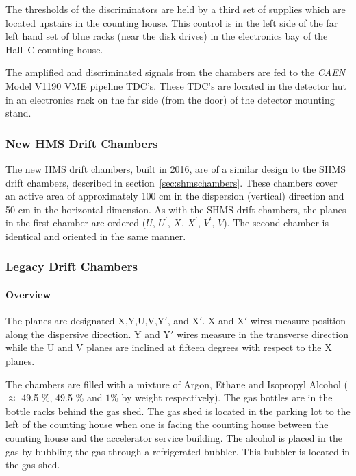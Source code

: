 The thresholds of the discriminators are held by a third set of supplies
which are located upstairs in the counting house. This control
is in the left side of the far left hand set of blue racks (near the disk drives) in the
electronics bay of the Hall~C counting house.

The amplified and discriminated signals from the chambers are fed
to the {\em CAEN} Model V1190 VME pipeline TDC's. These
TDC's are located in the detector hut in an electronics rack on the
far side (from the door) of the detector mounting stand.


\subsubsection{New HMS Drift Chambers}
The new HMS drift chambers, built in 2016, are of a similar design to the SHMS
drift chambers, described in section~\ref{sec:shmschambers}.  These chambers
cover an active area of approximately 100 cm in the dispersion (vertical)
direction and 50 cm in the horizontal dimension.   As with the SHMS
drift chambers, the planes in the first chamber are ordered
($U$, $U^{\prime}$, $X$, $X^{\prime}$, $V^{\prime}$, $V$).  The second
chamber is identical and oriented in the same manner.

\subsubsection{Legacy Drift Chambers}
\label{sec:legacydriftchambers}
\paragraph{Overview}


The planes are designated X,Y,U,V,Y$'$, and X$'$.
X and X$'$ wires measure position along the dispersive direction.
Y and Y$'$ wires measure in the transverse direction while
the U and V planes are inclined at fifteen degrees with respect to the
X planes.

The chambers are filled with a mixture of Argon, Ethane and Isopropyl Alcohol
($\approx$ 49.5 $\%$, 49.5 $\%$  and $1\%$ by weight respectively).
The gas bottles are in the bottle racks behind the gas shed. The gas shed
is located in the parking lot to the left of the counting house when one is facing the counting
house between the counting house and the accelerator
service building.  The alcohol is placed in the gas
by bubbling the gas through a refrigerated bubbler. This bubbler is
located in the gas shed.

